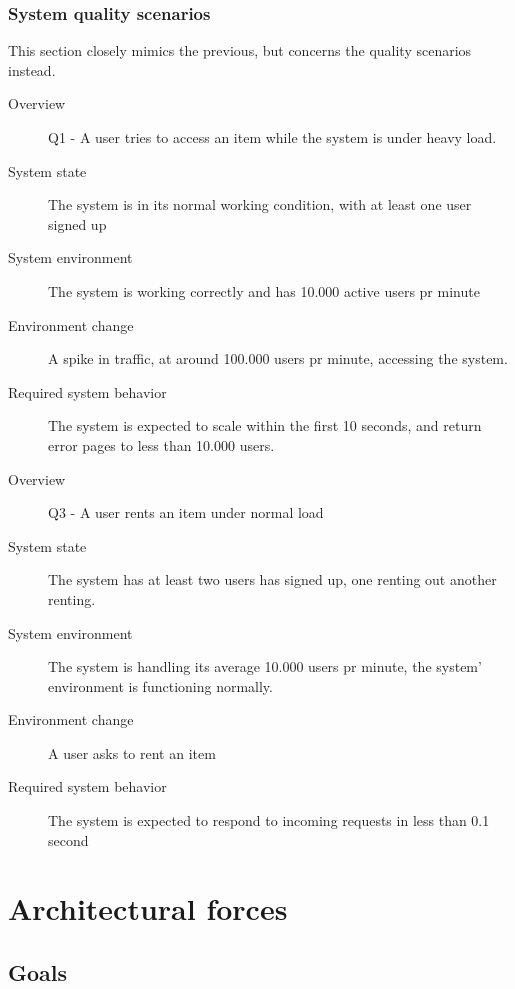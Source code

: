 \documentclass[a4paper,11pt]{report}
\begin{document}
\subsection{System quality scenarios}
\label{sec:syst-qual-scen}
This section closely mimics the previous, but concerns the quality scenarios
instead.

\begin{description}
    \item[Overview] Q1 - A user tries to access an item while the system is
        under heavy load.
    \item[System state] The system is in its normal working condition, with at
        least one user signed up
    \item[System environment] The system is working correctly and has 10.000
        active users pr minute
    \item[Environment change] A spike in traffic, at around 100.000 users pr
        minute, accessing the system.
    \item[Required system behavior] The system is expected to scale within the
        first 10 seconds, and return error pages to less than 10.000 users.
\end{description}

\begin{description}
    \item[Overview] Q3 - A user rents an item under normal load
    \item[System state] The system has at least two users has signed up, one
        renting out another renting.
    \item[System environment] The system is handling its average 10.000 users pr
        minute, the system' environment is functioning normally.
    \item[Environment change] A user asks to rent an item
    \item[Required system behavior] The system is expected to respond to
        incoming requests in less than 0.1 second
\end{description}


\chapter{Architectural forces}
\label{cha:architectural-forces}
\thispagestyle{fancy}

\section{Goals}
\label{sec:goals}
\end{document}
